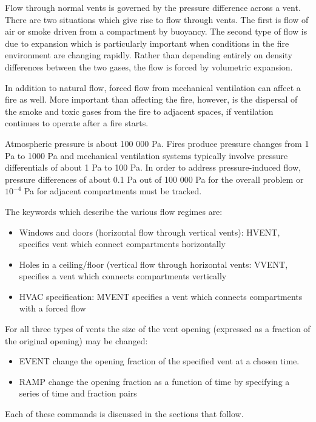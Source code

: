 Flow through normal vents is governed by the pressure difference across a vent.  There are two situations which give rise to flow through vents.  The first is flow of air or smoke driven from a compartment by buoyancy.  The second type of flow is due to expansion which is particularly important when conditions in the fire environment are changing rapidly.  Rather than depending entirely on density differences between the two gases, the flow is forced by volumetric expansion.

In addition to natural flow, forced flow from mechanical ventilation can affect a fire as well. More important than affecting the fire, however, is the dispersal of the smoke and toxic gases from the fire to adjacent spaces, if ventilation continues to operate after a fire starts.

Atmospheric pressure is about 100 000 Pa. Fires produce pressure changes from 1 Pa to 1000 Pa and mechanical ventilation systems typically involve pressure differentials of about 1 Pa to 100 Pa.  In order to address pressure-induced flow, pressure differences of about 0.1 Pa out of 100 000 Pa for the overall problem or $10^{-4}$ Pa for adjacent compartments must be tracked.

The keywords which describe the various flow regimes are:

\begin{itemize}
\item Windows and doors (horizontal flow through vertical vents): HVENT, specifies vent which connect compartments horizontally
\item Holes in a ceiling/floor (vertical flow through horizontal vents: VVENT, specifies a vent which connects compartments vertically
\item HVAC specification: MVENT specifies a vent which connects compartments with a forced flow
\end{itemize}

For all three types of vents the size of the vent opening (expressed as a fraction of the original opening) may be changed:

\begin{itemize}
\item EVENT change the opening fraction of the specified vent at a chosen time.
\item RAMP change the opening fraction as a function of time by specifying a series of time and fraction pairs
\end{itemize}

Each of these commands is discussed in the sections that follow.

